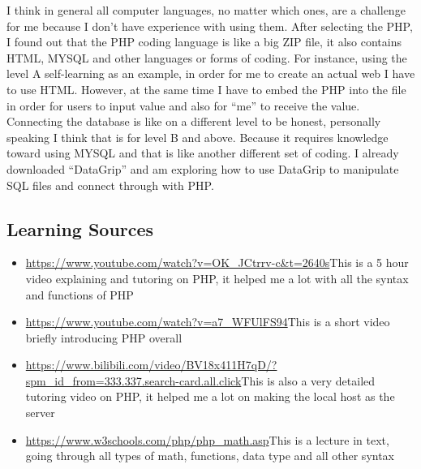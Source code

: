 \documentclass[a4paper, 11pt]{report}
\begin{document}
I think in general all computer languages, no matter which ones, are a challenge for me because I don’t have experience with using them. After selecting the PHP, I found out that the PHP coding language is like a big ZIP file, it also contains HTML, MYSQL and other languages or forms of coding. For instance, using the level A self-learning as an example, in order for me to create an actual web I have to use HTML. However, at the same time I have to embed the PHP into the file in order for users to input value and also for “me” to receive the value. Connecting the database is like on a different level to be honest, personally speaking I think that is for level B and above. Because it requires knowledge toward using MYSQL and that is like another different set of coding. I already downloaded “DataGrip” and am exploring how to use DataGrip to manipulate SQL files and connect through with PHP.

\subsection{Learning Sources}
\begin{itemize}
  \item \url{https://www.youtube.com/watch?v=OK_JCtrrv-c&t=2640s}{This is a 5 hour video explaining and tutoring on PHP, it helped me a lot with all the syntax and functions of PHP}\cite{PHP}
  \item \url{https://www.youtube.com/watch?v=a7_WFUlFS94}{This is a short video briefly introducing PHP overall}\cite{PHP100}
  \item \url{https://www.bilibili.com/video/BV18x411H7qD/?spm_id_from=333.337.search-card.all.click}{This is also a very detailed tutoring video on PHP, it helped me a lot on making the local host as the server}\cite{HM}
  \item \url{https://www.w3schools.com/php/php_math.asp}{This is a lecture in text, going through all types of math, functions, data type and all other syntax}\cite{W3}
\end{itemize}




\newpage
\end{document}
